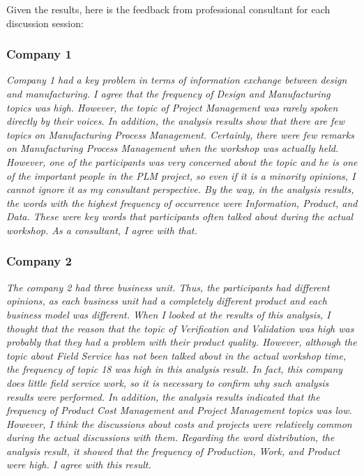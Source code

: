 \documentclass[10pt, conference, compsocconf]{IEEEtran}
\begin{document}
Given the results, here is the feedback from professional consultant for each discussion session:
\medskip

\subsubsection{Company 1}
{\it Company 1 had a key problem in terms of information exchange between design and manufacturing. I agree that the frequency of Design and Manufacturing topics was high. However, the topic of Project Management was rarely spoken directly by their voices. In addition, the analysis results show that there are few topics on Manufacturing Process Management. Certainly, there were few remarks on Manufacturing Process Management when the workshop was actually held. However, one of the participants was very concerned about the topic and he is one of the important people in the PLM project, so even if it is a minority opinions, I cannot ignore it as my consultant perspective. By the way, in the analysis results, the words with the highest frequency of occurrence were Information, Product, and Data. These were key words that participants often talked about during the actual workshop. As a consultant, I agree with that.}
\medskip

\subsubsection{Company 2}
{\it The company 2 had three business unit. Thus, the participants had different opinions, as each business unit had a completely different product and each business model was different. When I looked at the results of this analysis, I thought that the reason that the topic of Verification and Validation was high was probably that they had a problem with their product quality. However, although the topic about Field Service has not been talked about in the actual workshop time, the frequency of topic 18 was high in this analysis result. In fact, this company does little field service work, so it is necessary to confirm why such analysis results were performed. In addition, the analysis results indicated that the frequency of Product Cost Management and Project Management topics was low. However, I think the discussions about costs and projects were relatively common during the actual discussions with them. Regarding the word distribution, the analysis result, it showed that the frequency of Production, Work, and Product were high. I agree with this result.}
\end{document}
